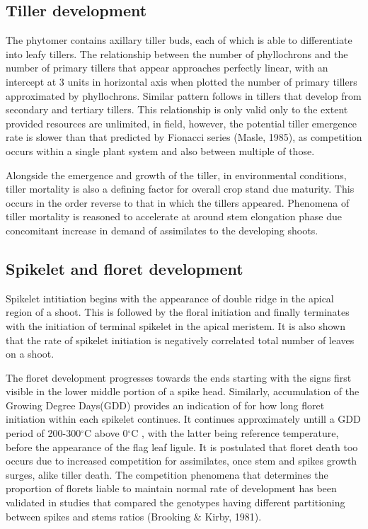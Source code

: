\documentclass[12pt,oneside]{dukestatscithesis} %
\theoremstyle{definition}
\theoremstyle{definition}
\theoremstyle{definition}
\theoremstyle{remark}
\begin{document}
\subsection{Tiller development}\label{tiller-development}

The phytomer contains axillary tiller buds, each of which is able to
differentiate into leafy tillers. The relationship between the number of
phyllochrons and the number of primary tillers that appear approaches
perfectly linear, with an intercept at 3 units in horizontal axis when
plotted the number of primary tillers approximated by phyllochrons.
Similar pattern follows in tillers that develop from secondary and
tertiary tillers. This relationship is only valid only to the extent
provided resources are unlimited, in field, however, the potential
tiller emergence rate is slower than that predicted by Fionacci series
(Masle, 1985), as competition occurs within a single plant system and
also between multiple of those.

Alongside the emergence and growth of the tiller, in environmental
conditions, tiller mortality is also a defining factor for overall crop
stand due maturity. This occurs in the order reverse to that in which
the tillers appeared. Phenomena of tiller mortality is reasoned to
accelerate at around stem elongation phase due concomitant increase in
demand of assimilates to the developing shoots.

\subsection{Spikelet and floret
development}\label{spikelet-and-floret-development}

Spikelet intitiation begins with the appearance of double ridge in the
apical region of a shoot. This is followed by the floral initiation and
finally terminates with the initiation of terminal spikelet in the
apical meristem. It is also shown that the rate of spikelet initiation
is negatively correlated total number of leaves on a shoot.

The floret development progresses towards the ends starting with the
signs first visible in the lower middle portion of a spike head.
Similarly, accumulation of the Growing Degree Days(GDD) provides an
indication of for how long floret initiation within each spikelet
continues. It continues approximately untill a GDD period of
200-300\(^\circ\)C above 0\(^\circ\)C , with the latter being reference
temperature, before the appearance of the flag leaf ligule. It is
postulated that floret death too occurs due to increased competition for
assimilates, once stem and spikes growth surges, alike tiller death. The
competition phenomena that determines the proportion of florets liable
to maintain normal rate of development has been validated in studies
that compared the genotypes having different partitioning between spikes
and stems ratios (Brooking \& Kirby, 1981).
\end{document}
